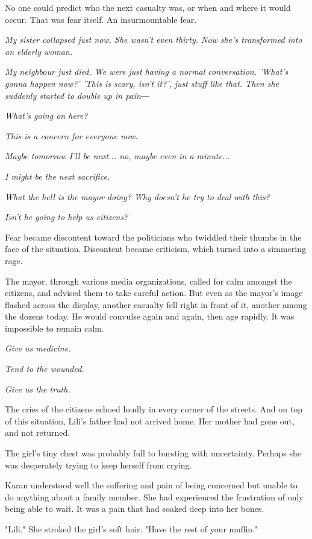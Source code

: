 No one could predict who the next casualty was, or when and where it
would occur. That was fear itself. An insurmountable fear.

\emph{My sister collapsed just now. She wasn't even thirty. Now she's
transformed into an elderly woman.}

\emph{My neighbour just died. We were just having a normal conversation.
'What's gonna happen now?' 'This is scary, isn't it?', just stuff like
that. Then she suddenly started to double up in pain―}

\emph{What's going on here?}

\emph{This is a concern for everyone now.}

\emph{Maybe tomorrow I'll be next... no, maybe even in a minute...}

\emph{I might be the next sacrifice.}

\emph{What the hell is the mayor doing? Why doesn't he try to deal with this?}

\emph{Isn't he going to help us citizens?}

Fear became discontent toward the politicians who twiddled their thumbs
in the face of the situation. Discontent became criticism, which turned
into a simmering rage.

The mayor, through various media organizations, called for calm amongst
the citizens, and advised them to take careful action. But even as the
mayor's image flashed across the display, another casualty fell right in
front of it, another among the dozens today. He would convulse again and
again, then age rapidly. It was impossible to remain calm.

\emph{Give us medicine.}

\emph{Tend to the wounded.}

\emph{Give us the truth.}

The cries of the citizens echoed loudly in every corner of the streets.
And on top of this situation, Lili's father had not arrived home. Her
mother had gone out, and not returned.

The girl's tiny chest was probably full to bursting with uncertainty.
Perhaps she was desperately trying to keep herself from crying.~

Karan understood well the suffering and pain of being concerned but
unable to do anything about a family member. She had experienced the
frustration of only being able to wait. It was a pain that had soaked
deep into her bones.

"Lili." She stroked the girl's soft hair. "Have the rest of your
muffin."

